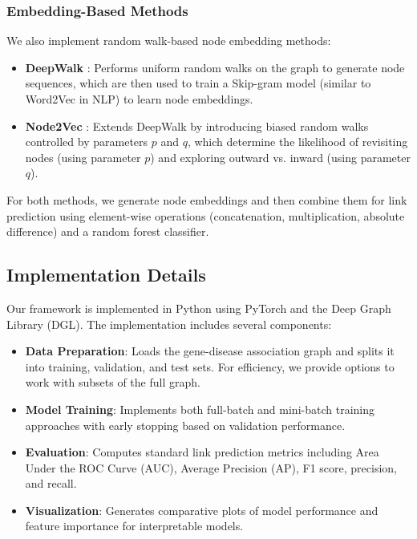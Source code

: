 \documentclass[conference]{IEEEtran}
\begin{document}
\subsubsection{Embedding-Based Methods}
We also implement random walk-based node embedding methods:

\begin{itemize}
\item \textbf{DeepWalk} \cite{perozzi2014deepwalk}: Performs uniform random walks on the graph to generate node sequences, which are then used to train a Skip-gram model (similar to Word2Vec in NLP) to learn node embeddings.

\item \textbf{Node2Vec} \cite{grover2016node2vec}: Extends DeepWalk by introducing biased random walks controlled by parameters $p$ and $q$, which determine the likelihood of revisiting nodes (using parameter $p$) and exploring outward vs. inward (using parameter $q$).
\end{itemize}

For both methods, we generate node embeddings and then combine them for link prediction using element-wise operations (concatenation, multiplication, absolute difference) and a random forest classifier.

\subsection{Implementation Details}
Our framework is implemented in Python using PyTorch and the Deep Graph Library (DGL). The implementation includes several components:

\begin{itemize}
\item \textbf{Data Preparation}: Loads the gene-disease association graph and splits it into training, validation, and test sets. For efficiency, we provide options to work with subsets of the full graph.
\item \textbf{Model Training}: Implements both full-batch and mini-batch training approaches with early stopping based on validation performance.
\item \textbf{Evaluation}: Computes standard link prediction metrics including Area Under the ROC Curve (AUC), Average Precision (AP), F1 score, precision, and recall.
\item \textbf{Visualization}: Generates comparative plots of model performance and feature importance for interpretable models.
\end{itemize}
\end{document}

